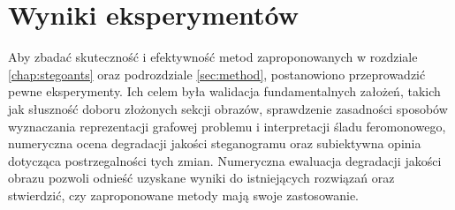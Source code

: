 \chapter{Wyniki eksperymentów}\label{chap:results}
{

    Aby zbadać skuteczność i efektywność metod zaproponowanych w rozdziale \ref{chap:stegoants} oraz podrozdziale
    \ref{sec:method}, postanowiono przeprowadzić pewne eksperymenty. Ich celem była walidacja fundamentalnych założeń,
    takich jak słuszność doboru złożonych sekcji obrazów, sprawdzenie zasadności sposobów wyznaczania reprezentacji
    grafowej problemu i interpretacji śladu feromonowego, numeryczna ocena degradacji jakości steganogramu oraz
    subiektywna opinia dotycząca postrzegalności tych zmian. Numeryczna ewaluacja degradacji jakości obrazu pozwoli
    odnieść uzyskane wyniki do istniejących rozwiązań oraz stwierdzić, czy zaproponowane metody mają swoje zastosowanie.

}
